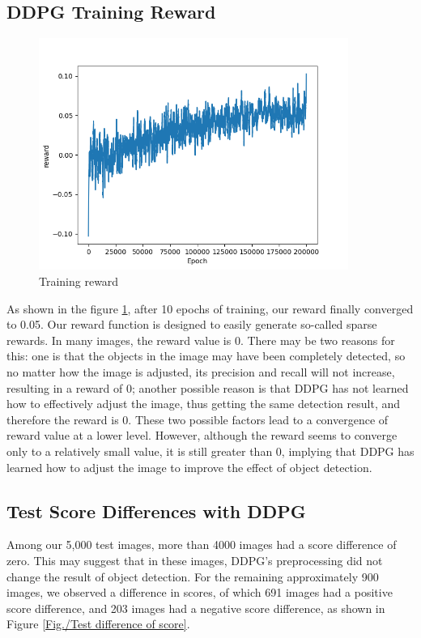 \documentclass{PHlab-thesis}
\begin{document}
\subsection{DDPG Training Reward}
\begin{figure}[!htb] 
    \centering 
    \includegraphics[width=0.9\textwidth]{images/training reward.png}
    \caption{Training reward} 
    \label{Fig.Training reward} 
\end{figure}
As shown in the figure \ref{Fig.Training reward}, after 10 epochs of training, our reward finally converged to 0.05. Our reward function is designed to easily generate so-called sparse rewards. In many images, the reward value is 0. There may be two reasons for this: one is that the objects in the image may have been completely detected, so no matter how the image is adjusted, its precision and recall will not increase, resulting in a reward of 0; another possible reason is that DDPG has not learned how to effectively adjust the image, thus getting the same detection result, and therefore the reward is 0. These two possible factors lead to a convergence of reward value at a lower level. However, although the reward seems to converge only to a relatively small value, it is still greater than 0, implying that DDPG has learned how to adjust the image to improve the effect of object detection.

\subsection{Test Score Differences with DDPG}

Among our 5,000 test images, more than 4000 images had a score difference of zero. This may suggest that in these images, DDPG's preprocessing did not change the result of object detection. For the remaining approximately 900 images, we observed a difference in scores, of which 691 images had a positive score difference, and 203 images had a negative score difference, as shown in Figure \ref{Fig./Test difference of score}.
\end{document}
